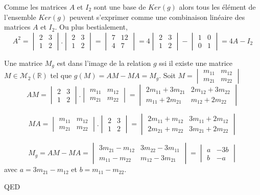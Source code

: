 \documentclass[]{book}
\theoremstyle{definition}
\newcommand{\bb}[1]{\mathbb{#1}}
\newcommand{\R}{\bb{R}}
\begin{document}
Comme les matrices $A$ et $I_2$ sont une base de $Ker(g)$ alors tous les \'el\'ement de l'ensemble $Ker(g)$ peuvent s'exprimer comme une combinaison lin\'eaire des matrices  $A$ et $I_2$.
Ou plus bestialement,
$$A^2 = 
\begin{vmatrix} 2 & 3 \\ 1 & 2 \end{vmatrix} . \begin{vmatrix} 2 & 3 \\ 1 & 2 \end{vmatrix} =
\begin{vmatrix} 7 & 12 \\ 4 & 7 \end{vmatrix}  = 
4\begin{vmatrix} 2 & 3 \\ 1 & 2 \end{vmatrix} - \begin{vmatrix} 1 & 0 \\ 0 & 1 \end{vmatrix} =
4A -I_2
$$

Une matrice $M_g$ est dans l'image de la relation $g$ ssi il existe une matrice $M \in \mathcal{M}_2(\R)$ tel que $g(M) = AM - MA = M_g$. Soit $M = \begin{vmatrix} m_{11} & m_{12} \\ m_{21} & m_{22} \end{vmatrix}$\\

$$
AM = \begin{vmatrix} 2 & 3 \\ 1 & 2 \end{vmatrix} . \begin{vmatrix} m_{11} & m_{12} \\ m_{21} & m_{22} \end{vmatrix} =
\begin{vmatrix} 2m_{11} +  3m_{21} & 2m_{12} + 3m_{22} \\ m_{11} + 2 m_{21} & m_{12} + 2m_{22} \end{vmatrix}
$$

$$
MA = \begin{vmatrix} m_{11} & m_{12} \\ m_{21} & m_{22} \end{vmatrix} . \begin{vmatrix} 2 & 3 \\ 1 & 2 \end{vmatrix}  =
\begin{vmatrix} 2m_{11} +  m_{12} & 3m_{11} + 2m_{12} \\ 2m_{21} + m_{22} & 3m_{21} + 2m_{22} \end{vmatrix}
$$

$$
M_g = AM - MA = 
\begin{vmatrix} 3m_{21} -  m_{12} & 3m_{22} - 3m_{11} \\ m_{11} - m_{22} & m_{12} - 3m_{21} \end{vmatrix} =
\begin{vmatrix} a & -3b \\ b & -a \end{vmatrix}
$$
avec $a=3m_{21} -  m_{12}$ et $b = m_{11} - m_{22}$.

QED
\end{document}

